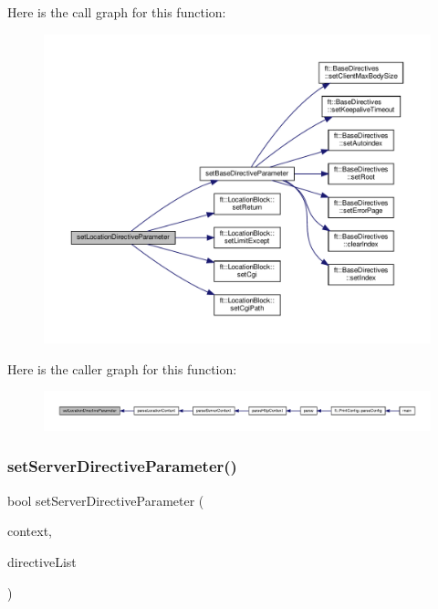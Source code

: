 Here is the call graph for this function\+:
\nopagebreak
\begin{figure}[H]
\begin{center}
\leavevmode
\includegraphics[width=350pt]{classft_1_1_parser_a82bee2278db1afa69bbb6eb6f192743c_cgraph}
\end{center}
\end{figure}
Here is the caller graph for this function\+:
\nopagebreak
\begin{figure}[H]
\begin{center}
\leavevmode
\includegraphics[width=350pt]{classft_1_1_parser_a82bee2278db1afa69bbb6eb6f192743c_icgraph}
\end{center}
\end{figure}
\mbox{\label{classft_1_1_parser_a18c1b12280ce1a16246a8ba09156116f}} 
\subsubsection{\texorpdfstring{set\+Server\+Directive\+Parameter()}{setServerDirectiveParameter()}}
{\footnotesize\ttfamily bool set\+Server\+Directive\+Parameter (\begin{DoxyParamCaption}\item[{\hyperlink{classft_1_1_server_block}{Server\+Block} \&}]{context,  }\item[{std\+::vector$<$ \hyperlink{classft_1_1_directive}{Directive} $>$}]{directive\+List }\end{DoxyParamCaption})\hspace{0.3cm}{\ttfamily [private]}}



